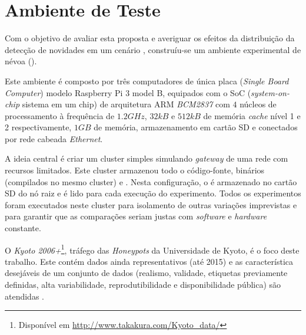 
\section{Ambiente de Teste}\label{sec:ambiente}

Com o objetivo de avaliar esta proposta e averiguar os efeitos da distribuição
da detecção de novidades em um cenário \iot, construíu-se um ambiente
experimental de névoa (\fog).

Este ambiente é composto por três computadores de única placa (\emph{Single
Board Computer}) modelo Raspberry Pi 3 model B, equipados com o SoC
(\emph{system-on-chip} sistema em um chip) de arquitetura ARM \emph{BCM2837} com
$4$ núcleos de processamento à frequência de $1.2GHz$, $32kB$ e $512kB$ de
memória \emph{cache} nível 1 e 2 respectivamente, $1GB$ de memória,
armazenamento em cartão SD e conectados por rede cabeada \emph{Ethernet}.

A ideia central é criar um cluster simples simulando \emph{gateway} de uma rede
\iot com recursos limitados.
Este cluster armazenou todo o código-fonte, binários (compilados no mesmo cluster) e
\dataset.
Nesta configuração, o \dataset é armazenado no cartão SD do nó raiz e é lido para
cada execução do experimento.
Todos os experimentos foram executados neste cluster para isolamento de outras
variações imprevistas e para garantir que as comparações seriam justas com
\emph{software} e \emph{hardware} constante.


O \dataset \emph{Kyoto 2006+}\footnote{Disponível em
\url{http://www.takakura.com/Kyoto\_data/}}, tráfego das \emph{Honeypots} da
Universidade de Kyoto, é o foco deste trabalho.
Este \dataset contém dados ainda representativos (até 2015) e as característica
desejáveis de um conjunto de dados (realismo, validade, etiquetas previamente
definidas, alta variabilidade, reprodutibilidade e disponibilidade pública) são
atendidas \cite{KyotoDataset,Song2011kyoto}.

